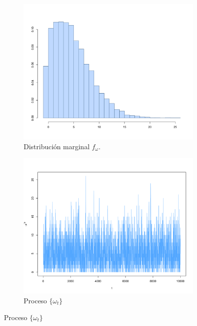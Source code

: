 \documentclass[11pt,a4paper]{article}
\begin{document}
\begin{figure}[!p]
    \centering
    \begin{subfigure}[t]{0.45\textwidth}
        \centering
        \includegraphics[width=\linewidth]{hier_hist_omega.png} 
        \caption{Distribución marginal $f_\omega$.} \label{fig:hier_hist_omega}
    \end{subfigure}
    \hfill
    \begin{subfigure}[t]{0.45\textwidth}
        \centering
        \includegraphics[width=\linewidth]{hier_chain_omega.png} 
        \caption{Proceso $\lbrace \omega_t \rbrace$} \label{fig:hier_chain_omega}
    \end{subfigure}


\end{figure}
\end{document}
